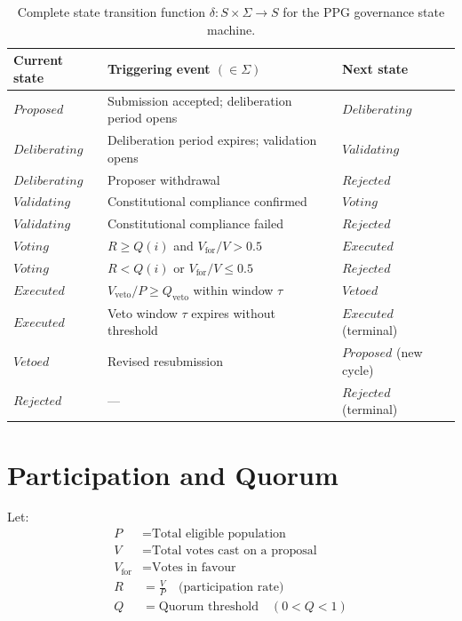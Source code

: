 \documentclass[12pt,a4paper,oneside]{report}
\begin{document}
\begin{table}[htbp]
\centering
\caption{Complete state transition function $\delta: S \times \Sigma \to S$ for the PPG governance state machine.}
\label{tab:transitions}
\begin{tabular}{@{} l l l @{}}
\toprule
\textbf{Current state} & \textbf{Triggering event} $(\in \Sigma)$ & \textbf{Next state} \\
\midrule
$\textit{Proposed}$ & Submission accepted; deliberation period opens & $\textit{Deliberating}$ \\
$\textit{Deliberating}$ & Deliberation period expires; validation opens & $\textit{Validating}$ \\
$\textit{Deliberating}$ & Proposer withdrawal & $\textit{Rejected}$ \\
$\textit{Validating}$ & Constitutional compliance confirmed & $\textit{Voting}$ \\
$\textit{Validating}$ & Constitutional compliance failed & $\textit{Rejected}$ \\
$\textit{Voting}$ & $R \geq Q(i)$ and $V_{\text{for}}/V > 0.5$ & $\textit{Executed}$ \\
$\textit{Voting}$ & $R < Q(i)$ or $V_{\text{for}}/V \leq 0.5$ & $\textit{Rejected}$ \\
$\textit{Executed}$ & $V_{\text{veto}}/P \geq Q_{\text{veto}}$ within window $\tau$ & $\textit{Vetoed}$ \\
$\textit{Executed}$ & Veto window $\tau$ expires without threshold & $\textit{Executed}$ (terminal) \\
$\textit{Vetoed}$ & Revised resubmission & $\textit{Proposed}$ (new cycle) \\
$\textit{Rejected}$ & --- & $\textit{Rejected}$ (terminal) \\
\bottomrule
\end{tabular}
\end{table}

\section{Participation and Quorum}

Let:
\begin{align}
  P &= \text{Total eligible population} \\
  V &= \text{Total votes cast on a proposal} \\
  V_{\text{for}} &= \text{Votes in favour} \\
  R &= \frac{V}{P} \quad \text{(participation rate)} \\
  Q &= \text{Quorum threshold} \quad (0 < Q < 1)
\end{align}
\end{document}
